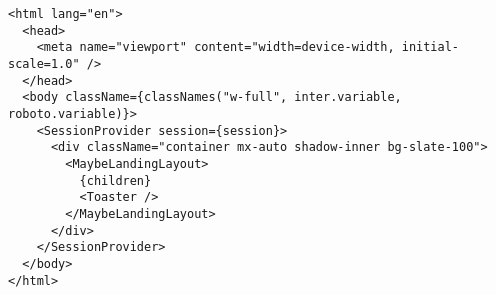 
\begin{verbatim}
<html lang="en">
  <head>
    <meta name="viewport" content="width=device-width, initial-scale=1.0" />
  </head>
  <body className={classNames("w-full", inter.variable, roboto.variable)}>
    <SessionProvider session={session}>
      <div className="container mx-auto shadow-inner bg-slate-100">
        <MaybeLandingLayout>
          {children}
          <Toaster />
        </MaybeLandingLayout>
      </div>
    </SessionProvider>
  </body>
</html>
\end{verbatim}
